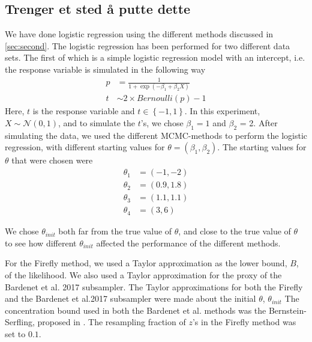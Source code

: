  \subsection{Trenger et sted å putte dette}\label{subsec:simple_log_reg}
 We have done logistic regression using the different methods discussed in  \ref{sec:second}. The logistic regression has been performed for two different data sets. The first of which is a simple logistic regression model with an intercept, i.e. the response variable is simulated in the following way 
 \begin{equation}\begin{split}
     p &= \frac{1}{1 + \exp(- \beta_1 + \beta_2 X)}
     \\ t &\sim 2 \times Bernoulli(p) - 1
     \end{split}
 \end{equation}
 Here, $t$ is the response variable and $t \in \left\{-1, 1\right\}$. 
 In this experiment, $X \sim \mathcal{N}\left(0,1\right)$, and to simulate the $t$'s, we chose $\beta_1 = 1$ and $\beta_2$ = 2. After simulating the data, we used the different MCMC-methods to perform the logistic regression, with different starting values for $\theta = \left(\beta_1, \beta_2\right)$. The starting values for $\theta$ that were chosen were 
 \begin{equation*}
 \begin{split}
     \theta_1 &= \left(-1, -2\right) \\
     \theta_2 &= \left(0.9, 1.8\right) \\
     \theta_3 & = \left(1.1, 1.1\right) \\
     \theta_4 &= \left(3, 6\right) 
 \end{split}
 \end{equation*} 
 
 We chose $\theta_{init}$ both far from the true value of $\theta$, and close to the true value of $\theta$ to see how different $\theta_{init}$ affected the performance of the different methods. 
 
 
 For the Firefly method, we used a Taylor approximation as the lower bound, $B$, of the likelihood. We also used a Taylor approximation for the proxy of the Bardenet et al. 2017 subsampler. The Taylor approximations for both the Firefly and the Bardenet et al.2017 subsampler were made about the initial $\theta$, $\theta_{init}$ The concentration bound used in both the Bardenet et al. methods was the Bernstein-Serfling, proposed in \cite{bardenet2015concentration}.  The resampling fraction of $z$'s in the Firefly method was set to $0.1$. 
 
